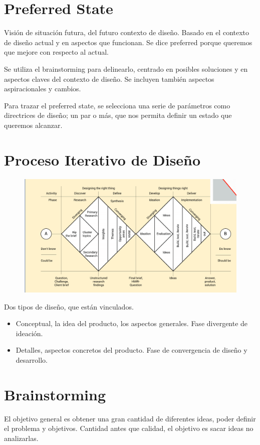 \documentclass[12pt, twoside, openright]{report} %
\begin{document}
\section{Preferred State}
Visión de situación futura, del futuro contexto de diseño. Basado en el contexto de diseño actual y en aspectos que funcionan. Se dice preferred porque queremos que mejore con respecto al actual.

Se utiliza el brainstorming para delinearlo, centrado en posibles soluciones y en aspectos claves del contexto de diseño. Se incluyen también aspectos aspiracionales y cambios.

Para trazar el preferred state, se selecciona una serie de parámetros como directrices de diseño; un par o más, que nos permita definir un estado que queremos alcanzar.

\section{Proceso Iterativo de Diseño}

\begin{figure}[H]
	{\includegraphics[scale=.4]{2021-03-20 21_09_36-L5.pdf - Foxit Reader.png}}
\end{figure}

Dos tipos de diseño, que están vinculados.
\begin{itemize}
  \item Conceptual, la idea del producto, los aspectos generales. Fase divergente de ideación.
  \item Detalles, aspectos concretos del producto. Fase de convergencia de diseño y desarrollo.
\end{itemize}

\section{Brainstorming}
El objetivo general es obtener una gran cantidad de diferentes ideas, poder definir el problema y objetivos. Cantidad antes que calidad, el objetivo es sacar ideas no analizarlas.
\end{document}
